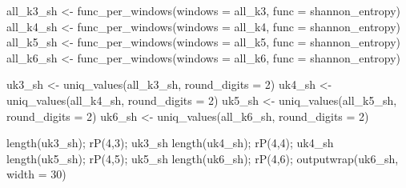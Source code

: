 \documentclass[
  letterpaper,
]{article}
\newenvironment{Shaded}{\begin{snugshade}}{\end{snugshade}}
\newcommand{\AttributeTok}[1]{\textcolor[rgb]{0.40,0.45,0.13}{#1}}
\newcommand{\DecValTok}[1]{\textcolor[rgb]{0.68,0.00,0.00}{#1}}
\newcommand{\FunctionTok}[1]{\textcolor[rgb]{0.28,0.35,0.67}{#1}}
\newcommand{\NormalTok}[1]{\textcolor[rgb]{0.00,0.23,0.31}{#1}}
\newcommand{\OtherTok}[1]{\textcolor[rgb]{0.00,0.23,0.31}{#1}}
\begin{document}
\begin{Shaded}
\begin{Highlighting}[]
\NormalTok{all\_k3\_sh }\OtherTok{\textless{}{-}} \FunctionTok{func\_per\_windows}\NormalTok{(}\AttributeTok{windows =}\NormalTok{ all\_k3,}
                              \AttributeTok{func =}\NormalTok{ shannon\_entropy)}
\NormalTok{all\_k4\_sh }\OtherTok{\textless{}{-}} \FunctionTok{func\_per\_windows}\NormalTok{(}\AttributeTok{windows =}\NormalTok{ all\_k4,}
                              \AttributeTok{func =}\NormalTok{ shannon\_entropy)}
\NormalTok{all\_k5\_sh }\OtherTok{\textless{}{-}} \FunctionTok{func\_per\_windows}\NormalTok{(}\AttributeTok{windows =}\NormalTok{ all\_k5,}
                              \AttributeTok{func =}\NormalTok{ shannon\_entropy)}
\NormalTok{all\_k6\_sh }\OtherTok{\textless{}{-}} \FunctionTok{func\_per\_windows}\NormalTok{(}\AttributeTok{windows =}\NormalTok{ all\_k6,}
                              \AttributeTok{func =}\NormalTok{ shannon\_entropy)}

\NormalTok{uk3\_sh }\OtherTok{\textless{}{-}} \FunctionTok{uniq\_values}\NormalTok{(all\_k3\_sh, }\AttributeTok{round\_digits =} \DecValTok{2}\NormalTok{)}
\NormalTok{uk4\_sh }\OtherTok{\textless{}{-}} \FunctionTok{uniq\_values}\NormalTok{(all\_k4\_sh, }\AttributeTok{round\_digits =} \DecValTok{2}\NormalTok{)}
\NormalTok{uk5\_sh }\OtherTok{\textless{}{-}} \FunctionTok{uniq\_values}\NormalTok{(all\_k5\_sh, }\AttributeTok{round\_digits =} \DecValTok{2}\NormalTok{)}
\NormalTok{uk6\_sh }\OtherTok{\textless{}{-}} \FunctionTok{uniq\_values}\NormalTok{(all\_k6\_sh, }\AttributeTok{round\_digits =} \DecValTok{2}\NormalTok{)}

\FunctionTok{length}\NormalTok{(uk3\_sh); }\FunctionTok{rP}\NormalTok{(}\DecValTok{4}\NormalTok{,}\DecValTok{3}\NormalTok{); uk3\_sh}
\FunctionTok{length}\NormalTok{(uk4\_sh); }\FunctionTok{rP}\NormalTok{(}\DecValTok{4}\NormalTok{,}\DecValTok{4}\NormalTok{); uk4\_sh}
\FunctionTok{length}\NormalTok{(uk5\_sh); }\FunctionTok{rP}\NormalTok{(}\DecValTok{4}\NormalTok{,}\DecValTok{5}\NormalTok{); uk5\_sh}
\FunctionTok{length}\NormalTok{(uk6\_sh); }\FunctionTok{rP}\NormalTok{(}\DecValTok{4}\NormalTok{,}\DecValTok{6}\NormalTok{); }\FunctionTok{outputwrap}\NormalTok{(uk6\_sh, }\AttributeTok{width =} \DecValTok{30}\NormalTok{)}
\end{Highlighting}
\end{Shaded}
\end{document}
